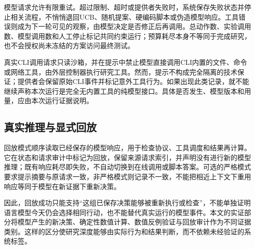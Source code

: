 模型请求允许有限重试。超过限制、超时或提供者失败时，系统保存失败状态并停止相关流程，不悄悄退回UCB、随机提案、硬编码脚本或伪造模型响应。工具错误则成为下一轮可见的观察，由模型决定是否修正后再调用。总动作数、实验调用数、模型调用数和人工停止标记共同约束运行；预算耗尽本身不等同于完成研究，也不会授权尚未冻结的方案访问最终测试。

真实CLI调用请求只读沙箱，并在提示中禁止模型直接调用CLI内置的文件、命令或网络工具，由外层控制器执行研究工具。然而，提示不构成完全隔离的技术保证；提供者会保留原始CLI事件并标记意外工具行为。如果出现此类记录，就不能继续声称本次运行是完全无内置工具的纯模型接口。具体是否发生、模型版本和用量，应由本次运行证据说明。

\subsection{真实推理与显式回放}

回放模式顺序读取已经保存的模型响应，用于检查协议、工具调度和结果再计算。它在状态和请求审计中标记为回放，保留来源请求索引，并声明没有进行新的模型推理；既有响应耗尽即失败，不自动切换到在线调用或脚本答案。可选的严格模式要求提示摘要与原请求一致，非严格模式则记录不一致，不能把相近上下文下重用响应等同于模型在新证据下重新决策。

因此，回放成功只能支持“这组已保存决策能够被重新执行或检查”，不能单独证明语言模型今天仍会选择相同行动，也不能替代真实运行的模型事件。本文的实证部分将模型产生的新决策、确定性数值计算、数值反例验证与回放审计作为不同证据类别。这样的区分使研究深度能够由实际行为和结果判断，而不依赖未经验证的系统标签。
